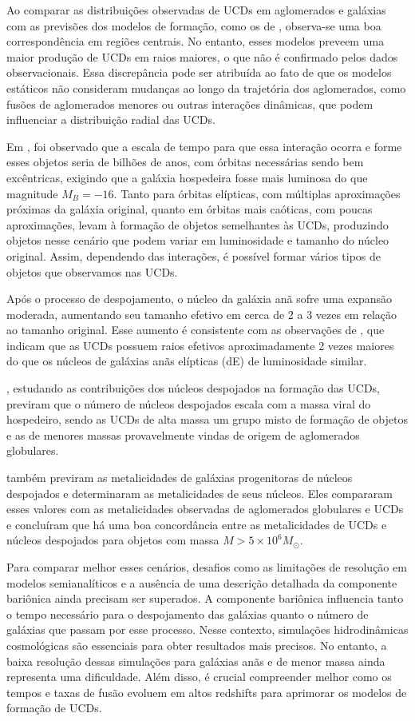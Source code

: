 Ao comparar as distribuições observadas de UCDs em aglomerados e galáxias com as previsões dos modelos de formação, como os de \cite{Thomas_2008}, observa-se uma boa correspondência em regiões centrais. No entanto, esses modelos preveem uma maior produção de UCDs em raios maiores, o que não é confirmado pelos dados observacionais. Essa discrepância pode ser atribuída ao fato de que os modelos estáticos não consideram mudanças ao longo da trajetória dos aglomerados, como fusões de aglomerados menores ou outras interações dinâmicas, que podem influenciar a distribuição radial das UCDs.

Em \cite{Bekki_2003}, foi observado que a escala de tempo para que essa interação ocorra e forme esses objetos seria de bilhões de anos, com órbitas necessárias sendo bem excêntricas, exigindo que a galáxia hospedeira fosse mais luminosa do que magnitude $M_B = -16$. Tanto para órbitas elípticas, com múltiplas aproximações próximas da galáxia original, quanto em órbitas mais caóticas, com poucas aproximações, levam à formação de objetos semelhantes às UCDs, produzindo objetos nesse cenário que podem variar em luminosidade e tamanho do núcleo original. Assim, dependendo das interações, é possível formar vários tipos de objetos que observamos nas UCDs.

Após o processo de despojamento, o núcleo da galáxia anã sofre uma expansão moderada, aumentando seu tamanho efetivo em cerca de 2 a 3 vezes em relação ao tamanho original. Esse aumento é consistente com as observações de \cite{Evstigneeva_2008}, que indicam que as UCDs possuem raios efetivos aproximadamente 2 vezes maiores do que os núcleos de galáxias anãs elípticas (dE) de luminosidade similar.

\cite{Pfeffer_2016}, estudando as contribuições dos núcleos despojados na formação das UCDs, previram que o número de núcleos despojados escala com a massa viral do hospedeiro, sendo as UCDs de alta massa um grupo misto de formação de objetos e as de menores massas provavelmente vindas de origem de aglomerados globulares.

\cite{Pfeffer_2016} também previram as metalicidades de galáxias progenitoras de núcleos despojados e determinaram as metalicidades de seus núcleos. Eles compararam esses valores com as metalicidades observadas de aglomerados globulares e UCDs e concluíram que há uma boa concordância entre as metalicidades de UCDs e núcleos despojados para objetos com massa $M > 5 \times 10^6 M_{\odot}$.

Para comparar melhor esses cenários, desafios como as limitações de resolução em modelos semianalíticos e a ausência de uma descrição detalhada da componente bariônica ainda precisam ser superados. A componente bariônica influencia tanto o tempo necessário para o despojamento das galáxias quanto o número de galáxias que passam por esse processo. Nesse contexto, simulações hidrodinâmicas cosmológicas são essenciais para obter resultados mais precisos. No entanto, a baixa resolução dessas simulações para galáxias anãs e de menor massa ainda representa uma dificuldade. Além disso, é crucial compreender melhor como os tempos e taxas de fusão evoluem em altos redshifts para aprimorar os modelos de formação de UCDs.

